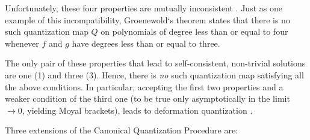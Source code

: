 \documentclass[twoside,a4paper,11pt]{article}
\numberwithin{equation}{section}
\begin{document}
Unfortunately, these four properties are mutually inconsistent \cite{incompatibility}. Just as one example of this incompatibility, Groenewold`s theorem \cite{GROENEWOLDtheorem} states that there is no such quantization map $Q$ on polynomials of degree less than or equal to four whenever $f$ and $g$ have degrees less than or equal to three.

The only pair of these properties that lead to self-consistent, non-trivial solutions are one (1) and three (3). Hence, there is \textit{no} such quantization map satisfying all the above conditions.  In particular, accepting the first two properties and a weaker condition of the third one (to be true only asymptotically in the limit $ \to 0$, yielding Moyal brackets), leads to deformation quantization \cite{DefQuantPhys}.

Three extensions of the Canonical Quantization Procedure are:
\end{document}
